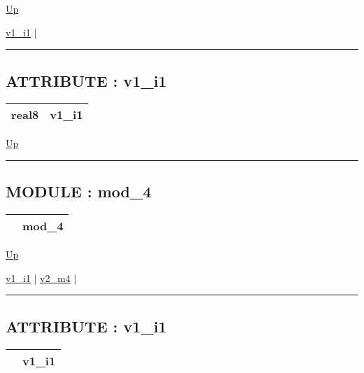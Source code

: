 \hyperlink{ecldoc:intest.example_2}{Up}

\par


\hyperlink{ecldoc:intest.example_2.iface_1.v1_i1}{v1\_i1}  |

\rule{\textwidth}{0.4pt}

\subsection*{ATTRIBUTE : v1\_i1}
\hypertarget{ecldoc:intest.example_2.iface_1.v1_i1}{}

{\renewcommand{\arraystretch}{1.5}
\begin{tabularx}{\textwidth}{|>{\raggedright\arraybackslash}l|X|}
\hline
\hspace{0pt}real8 & v1\_i1 \\
\hline
\end{tabularx}
}

\hyperlink{ecldoc:intest.example_2.iface_1}{Up}

\par


\rule{\textwidth}{0.4pt}


\subsection*{MODULE : mod\_4}
\hypertarget{ecldoc:intest.example_2.mod_4}{}

{\renewcommand{\arraystretch}{1.5}
\begin{tabularx}{\textwidth}{|>{\raggedright\arraybackslash}l|X|}
\hline
\hspace{0pt} & mod\_4 \\
\hline
\end{tabularx}
}

\hyperlink{ecldoc:intest.example_2}{Up}

\par


\hyperlink{ecldoc:intest.example_2.mod_4.v1_i1}{v1\_i1}  |
\hyperlink{ecldoc:intest.example_2.mod_4.v2_m4}{v2\_m4}  |

\rule{\textwidth}{0.4pt}

\subsection*{ATTRIBUTE : v1\_i1}
\hypertarget{ecldoc:intest.example_2.mod_4.v1_i1}{}

{\renewcommand{\arraystretch}{1.5}
\begin{tabularx}{\textwidth}{|>{\raggedright\arraybackslash}l|X|}
\hline
\hspace{0pt} & v1\_i1 \\
\hline
\end{tabularx}
}

